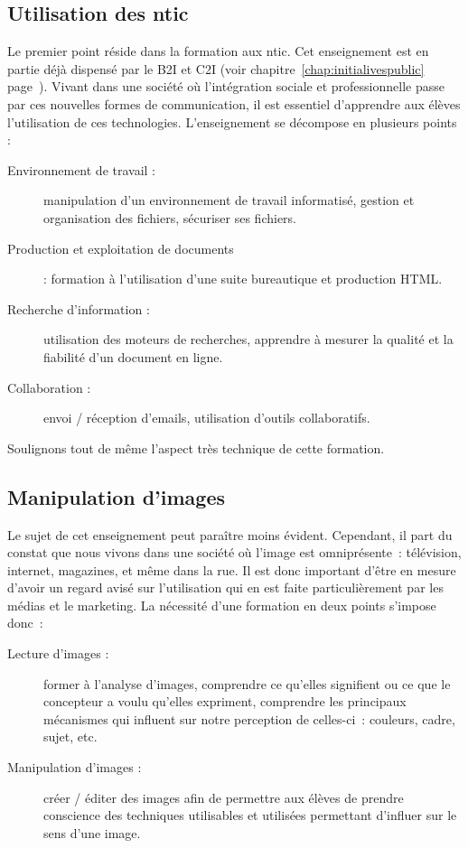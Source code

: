 \subsection{Utilisation des \gls{ntic}}
Le premier point réside dans la formation aux \gls{ntic}. Cet enseignement est en partie déjà dispensé par le B2I et C2I (voir chapitre~\ref{chap:initialivespublic} page~\pageref{chap:initialivespublic}). Vivant dans une société où l'intégration sociale et professionnelle passe par ces nouvelles formes de communication, il est essentiel d'apprendre aux élèves l'utilisation de ces technologies. L'enseignement se décompose en plusieurs points :

\begin{description}
  \item[Environnement de travail :] manipulation d'un environnement de travail informatisé, gestion et organisation des fichiers, sécuriser ses fichiers.
  \item[Production et exploitation de documents] : formation à l'utilisation d'une suite bureautique et production HTML.
  \item[Recherche d'information :] utilisation des moteurs de recherches, apprendre à mesurer la qualité et la fiabilité d'un document en ligne.
  \item[Collaboration :] envoi / réception d'emails, utilisation d'outils collaboratifs.
\end{description}

Soulignons tout de même l'aspect très technique de cette formation.

\subsection{Manipulation d'images}
Le sujet de cet enseignement peut paraître moins évident. Cependant,
il part du constat que nous vivons dans une société où l'image est
omniprésente~: télévision, internet, magazines, et même dans la
rue. Il est donc important d'être en mesure d'avoir un regard avisé
sur l'utilisation qui en est faite particulièrement par les médias et
le marketing. La nécessité d'une formation en deux points s'impose donc~:

\begin{description}
  \item[Lecture d'images :] former à l'analyse d'images, comprendre ce
    qu'elles signifient ou ce que le concepteur a voulu qu'elles expriment,
    comprendre les principaux mécanismes qui influent sur notre
    perception de celles-ci~: couleurs, cadre, sujet, etc.
  \item[Manipulation d'images :] créer / éditer des images afin de
    permettre aux élèves de prendre conscience des techniques
    utilisables et utilisées permettant d'influer sur le sens d'une image.
\end{description}

